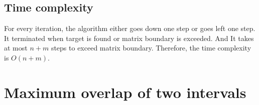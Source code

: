 \documentclass[paper=a4, fontsize=11pt]{scrartcl} %
\numberwithin{equation}{section} %
\numberwithin{figure}{section} %
\numberwithin{table}{section} %
\newcounter{claimcounter}
\numberwithin{claimcounter}{section}
\newenvironment{claim}{\stepcounter{claimcounter}{\textbf{Claim \theclaimcounter:}}}{}
\begin{document}






\subsection*{Time complexity}
For every iteration, the algorithm either goes down one step or goes left 
one step. It terminated when target is found or matrix boundary is
exceeded. And It takes at most $n+m$ steps to exceed matrix boundary. 
Therefore, the time complexity is $O(n+m)$. 



\section{Maximum overlap of two intervals}
\end{document}
